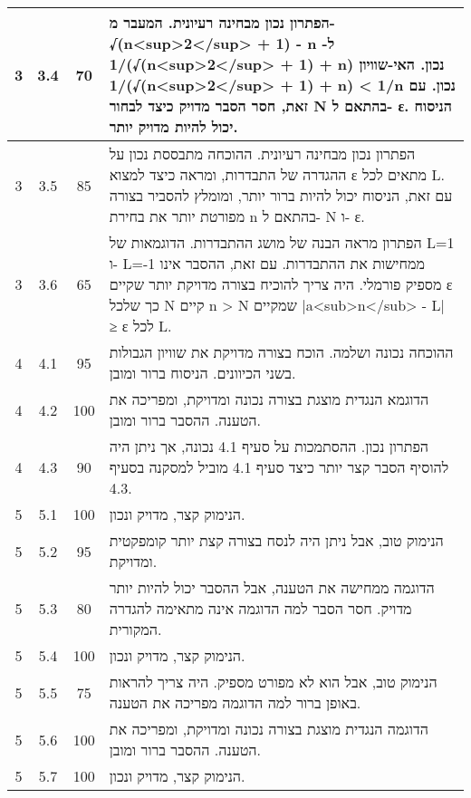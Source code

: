 \documentclass{article}
\begin{document}
\begin{RTL}
\begin{tabular}{|c|c|c|p{10cm}|}
3 & 3.4 & 70 & הפתרון נכון מבחינה רעיונית.  המעבר מ- √(n<sup>2</sup> + 1) - n  ל- 1/(√(n<sup>2</sup> + 1) + n)  נכון.  האי-שוויון 1/(√(n<sup>2</sup> + 1) + n) < 1/n  נכון.  עם זאת,  חסר הסבר מדויק כיצד לבחור N בהתאם ל- ε.  הניסוח יכול להיות מדויק יותר. \\ \hline
3 & 3.5 & 85 & הפתרון נכון מבחינה רעיונית.  ההוכחה  מתבססת נכון על ההגדרה של התבדרות, ומראה כיצד למצוא  ε  מתאים לכל  L.   עם זאת, הניסוח  יכול להיות ברור יותר,  ומומלץ להסביר בצורה מפורטת יותר את בחירת  n  בהתאם ל- N ו-  ε. \\ \hline
3 & 3.6 & 65 & הפתרון מראה הבנה של מושג ההתבדרות.  הדוגמאות של L=1 ו- L=-1  ממחישות את ההתבדרות.  עם זאת, ההסבר אינו מספיק פורמלי.  היה צריך להוכיח בצורה  מדויקת יותר שקיים ε  כך שלכל N קיים n > N שמקיים |a<sub>n</sub> - L| ≥ ε  לכל  L. \\ \hline
4 & 4.1 & 95 & ההוכחה נכונה ושלמה.  הוכח  בצורה מדויקת את שוויון הגבולות בשני הכיוונים.  הניסוח ברור ומובן. \\ \hline
4 & 4.2 & 100 & הדוגמא הנגדית מוצגת בצורה נכונה ומדויקת, ומפריכה את הטענה.  ההסבר ברור ומובן. \\ \hline
4 & 4.3 & 90 & הפתרון נכון.  ההסתמכות על סעיף 4.1  נכונה, אך ניתן היה להוסיף  הסבר קצר יותר כיצד סעיף 4.1  מוביל למסקנה  בסעיף 4.3. \\ \hline
5 & 5.1 & 100 & הנימוק קצר, מדויק ונכון. \\ \hline
5 & 5.2 & 95 & הנימוק טוב,  אבל ניתן היה לנסח בצורה  קצת יותר  קומפקטית ומדויקת. \\ \hline
5 & 5.3 & 80 & הדוגמה  ממחישה את הטענה,  אבל  ההסבר  יכול להיות יותר  מדויק.  חסר הסבר  למה הדוגמה  אינה מתאימה להגדרה המקורית. \\ \hline
5 & 5.4 & 100 & הנימוק קצר, מדויק ונכון. \\ \hline
5 & 5.5 & 75 & הנימוק  טוב,  אבל  הוא לא  מפורט מספיק.  היה  צריך להראות  באופן  ברור  למה  הדוגמה  מפריכה  את  הטענה. \\ \hline
5 & 5.6 & 100 & הדוגמה הנגדית מוצגת בצורה נכונה ומדויקת, ומפריכה את הטענה.  ההסבר ברור ומובן. \\ \hline
5 & 5.7 & 100 & הנימוק קצר, מדויק ונכון. \\ \hline
\end{tabular}
\end{RTL}
\end{document}
